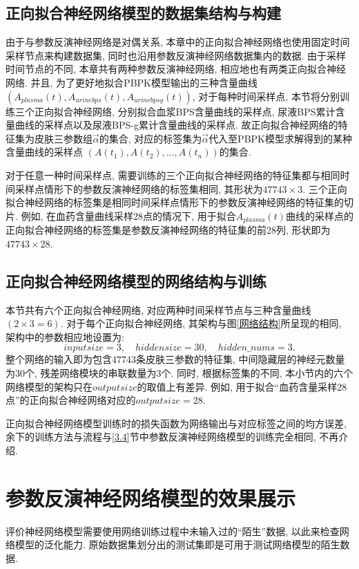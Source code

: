 \documentclass[a4paper,punct=banjiao,twoside]{ctexrep}
\theoremstyle{plain}
\theoremstyle{definition}
\theoremstyle{remark}
\begin{document}
\subsection{正向拟合神经网络模型的数据集结构与构建}
由于与参数反演神经网络是对偶关系, 本章中的正向拟合神经网络也使用固定时间采样节点来构建数据集, 同时也沿用参数反演神经网络数据集内的数据. 由于采样时间节点的不同, 本章共有两种参数反演神经网络, 相应地也有两类正向拟合神经网络.
并且, 为了更好地拟合PBPK模型输出的三种含量曲线$(A_{plasma}(t), A_{urinebps}(t), A_{urinebpsg}(t))$, 对于每种时间采样点, 本节将分别训练三个正向拟合神经网络, 分别拟合血浆BPS含量曲线的采样点,
尿液BPS累计含量曲线的采样点以及尿液BPS-g累计含量曲线的采样点. 故正向拟合神经网络的特征集为皮肤三参数组$\vec{\alpha}$的集合, 对应的标签集为$\vec{\alpha}$代入至PBPK模型求解得到的某种含量曲线的采样点 $(A(t_1),A(t_2),\dots,A(t_n))$的集合.

对于任意一种时间采样点, 需要训练的三个正向拟合神经网络的特征集都与相同时间采样点情形下的参数反演神经网络的标签集相同, 其形状为$47743 \times 3$.
三个正向拟合神经网络的标签集是相同时间采样点情形下的参数反演神经网络的特征集的切片. 例如, 在血药含量曲线采样28点的情况下, 用于拟合$A_{plasma}(t)$曲线的采样点的正向拟合神经网络的标签集是参数反演神经网络的特征集的前28列, 形状即为$47743 \times 28$.

\subsection{正向拟合神经网络模型的网络结构与训练}

本节共有六个正向拟合神经网络, 对应两种时间采样节点与三种含量曲线$(2\times 3 = 6)$. 对于每个正向拟合神经网络, 其架构与图\ref{网络结构}所呈现的相同, 架构中的参数相应地设置为:
$$
inputsize = 3, \quad hiddensize = 30, \quad hidden\_nums = 3.
$$
\noindent 整个网络的输入即为包含47743条皮肤三参数的特征集, 中间隐藏层的神经元数量为30个, 残差网络模块的串联数量为3个. 同时, 根据标签集的不同, 本小节内的六个网络模型的架构只在$outputsize$的取值上有差异. 例如, 用于拟合``血药含量采样28点''的正向拟合神经网络对应的$outputsize=28$.

正向拟合神经网络模型训练时的损失函数为网络输出与对应标签之间的均方误差, 余下的训练方法与流程与\ref{3.4}节中参数反演神经网络模型的训练完全相同, 不再介绍.

\section{参数反演神经网络模型的效果展示}

评价神经网络模型需要使用网络训练过程中未输入过的``陌生''数据, 以此来检查网络模型的泛化能力. 原始数据集划分出的测试集即是可用于测试网络模型的陌生数据.
\end{document}
